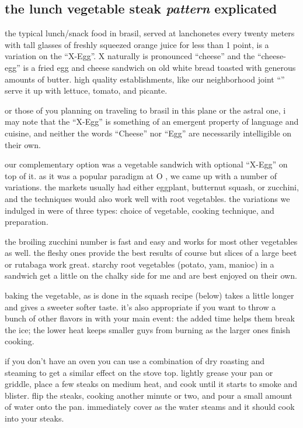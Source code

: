 \subsection{the lunch vegetable steak \textit{pattern} explicated}

the typical lunch/snack food in brasil, served at lanchonetes every
twenty meters with tall glasses of freshly squeezed orange juice for
less than 1 point, is a variation on the ``X-Egg''. X naturally is
pronounced ``cheese'' and the ``cheese-egg'' is a fried egg and cheese
sandwich on old white bread toasted with generous amounts of
butter. high quality establishments, like our neighborhood joint
``'' serve it up with lettuce, tomato, and picante.

or those of you planning on traveling to brasil in this plane or the
astral one, i may note that the ``X-Egg'' is something of an emergent
property of language and cuisine, and neither the words ``Cheese'' nor
``Egg'' are necessarily intelligible on their own.

our complementary option was a vegetable sandwich with optional
``X-Egg'' on top of it. as it was a popular paradigm at O , we
came up with a number of variations. the markets usually had either
eggplant, butternut squash, or zucchini, and the techniques would also
work well with root vegetables. the variations we indulged in were of
three types: choice of  vegetable, cooking technique, and
preparation.

the broiling zucchini number is fast and easy and works for most other
vegetables as well. the fleshy ones provide the best results of course
but slices of a large beet or rutabaga work great. starchy root
vegetables (potato, yam, manioc) in a sandwich get a little on the
chalky side for me and are best enjoyed on their own.

baking the vegetable, as is done in the squash recipe (below) takes a
little longer and gives a sweeter softer taste. it's also appropriate
if you want to throw a bunch of other flavors in with your main event:
the added time helps them break the ice; the lower heat keeps smaller
guys from burning as the larger ones finish cooking.

if you don't have an oven you can use a combination of dry roasting
and steaming to get a similar effect on the stove top. lightly grease
your pan or griddle, place a few steaks on medium heat, and cook until
it starts to smoke and blister. flip the steaks, cooking another
minute or two, and pour a small amount of water onto the
pan. immediately cover as the water steams and it should cook into
your steaks.

